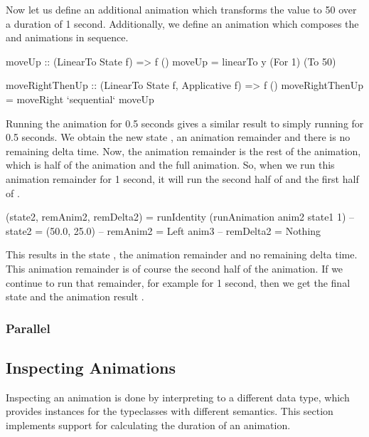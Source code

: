 Now let us define an additional animation  which transforms the  value to 50 over a duration of 1 second. Additionally, we define an animation  which composes the  and  animations in sequence.

\begin{code}
moveUp :: (LinearTo State f) => f ()
moveUp = linearTo y (For 1) (To 50)

moveRightThenUp :: (LinearTo State f, Applicative f) => f ()
moveRightThenUp = moveRight `sequential` moveUp
\end{code}

Running the  animation for 0.5 seconds gives a similar result to simply running  for 0.5 seconds. We obtain the new state , an animation remainder  and there is no remaining delta time. Now, the animation remainder is the rest of the  animation, which is half of the  animation and the full  animation. So, when we run this animation remainder for 1 second, it will run the second half of  and the first half of .

\begin{code}
(state2, remAnim2, remDelta2) =
  runIdentity (runAnimation anim2 state1 1)
-- state2 = (50.0, 25.0)
-- remAnim2 = Left anim3
-- remDelta2 = Nothing
\end{code}

This results in the state , the animation remainder  and no remaining delta time. This animation remainder is of course the second half of the  animation. If we continue to run that remainder, for example for 1 second, then we get the final state  and the animation result \hs{()}.

\subsubsection{Parallel}



\subsection{Inspecting Animations}

Inspecting an animation is done by interpreting \dsl{} to a different data type, which provides instances for the typeclasses with different semantics. This section implements support for calculating the duration of an animation.

